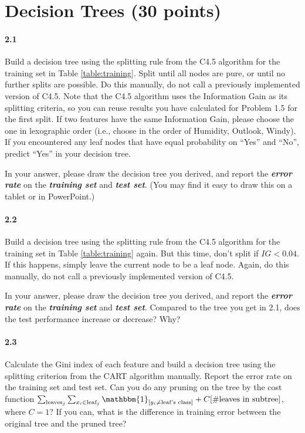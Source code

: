 \documentclass[11pt]{article}
\begin{document}
\section{Decision Trees (30 points)}
\paragraph{2.1} Build a decision tree using the splitting rule from the C4.5 algorithm for the training set in Table \ref{table:training}. Split until all nodes are pure, or until no further splits are possible. Do this manually, do not call a previously implemented version of C4.5. Note that the C4.5 algorithm uses the Information Gain as its splitting criteria, so you can reuse results you have calculated for Problem 1.5 for the first split. If two features have the same Information Gain, please choose the one in lexographic order (i.e., choose in the order of Humidity, Outlook, Windy). If you encountered any leaf nodes that have equal probability on ``Yes'' and ``No'', predict ``Yes'' in your decision tree.
    
    In your answer, please draw the decision tree you derived, and report the \textbf{\textit{error rate}} on the \textbf{\textit{training set}} and \textbf{\textit{test set}}. (You may find it easy to draw this on a tablet or in PowerPoint.)



    
\paragraph{2.2} Build a decision tree using the splitting rule from the C4.5 algorithm for the training set in Table \ref{table:training} again. But this time, don't split if $IG < 0.04$. If this happens, simply leave the current node to be a leaf node. Again, do this manually, do not call a previously implemented version of C4.5. 
    
In your answer, please draw the decision tree you derived, and report the \textbf{\textit{error rate}} on the \textbf{\textit{training set}} and \textbf{\textit{test set}}. Compared to the tree you get in 2.1, does the test performance increase or decrease? Why?



\paragraph{2.3}  Calculate the Gini index of each feature and build a decision tree using the splitting criterion from the CART algorithm manually. Report the error rate on the training set and test set. Can you do any pruning on the tree by the cost function $\sum_{\text{leaves}_j} \sum_{x_i \in \text{leaf}_j} \mathbbm{1}_{[y_i \neq \text{leaf's class}]} + C[\#\text{leaves in subtree}] $, where $C = 1$? If you can, what is the difference in training error between the original tree and the pruned tree?
    
\end{document}
